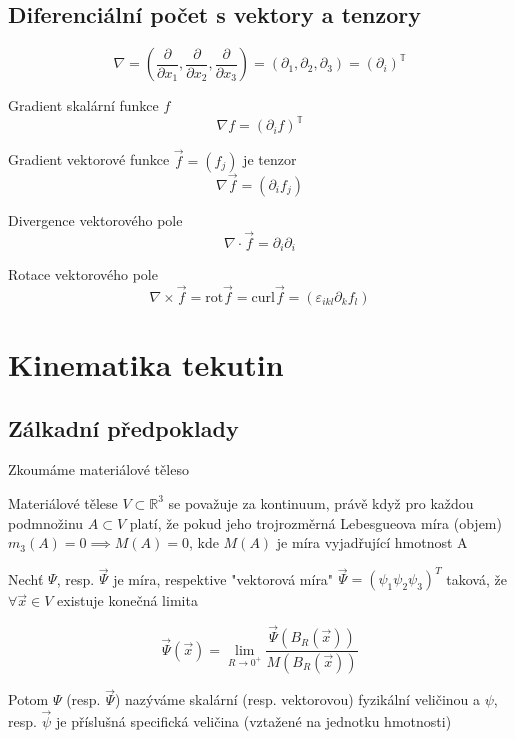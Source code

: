 \documentclass[../main.tex]{subfiles}
\begin{document}
\subsection{Diferenciální počet s vektory a tenzory}

\begin{equation*}
    \nabla = (\frac{\partial}{\partial x_1}, \frac{\partial}{\partial x_2}, \frac{\partial}{\partial x_3}) = (\partial_1, \partial_2, \partial_3) =  (\partial_i)^\mathbb{T}
\end{equation*}


Gradient skalární funkce $f$
\begin{equation*}
    \nabla f = (\partial_i f)^\mathbb{T}
\end{equation*}

Gradient vektorové funkce $\vec{f} = (f_j)$ je tenzor
\begin{equation*}
    \nabla \vec{f} = (\partial_i f_j)
\end{equation*}

Divergence vektorového pole
\begin{equation*}
    \nabla \cdot \vec{f} = \partial_i \partial_i 
\end{equation*}


Rotace vektorového pole 
\begin{equation*}
    \nabla\times\vec{f} = \text{rot} \vec{f} = \text{curl} \vec{f} = (\varepsilon_{ikl} \partial_k f_l)
\end{equation*}

\section{Kinematika tekutin}
\subsection{Zálkadní předpoklady}
Zkoumáme materiálové těleso 
\begin{definition}
    Materiálové tělese $V\subset \mathbb{R}^3$ se považuje za kontinuum, právě když pro každou podmnožinu $A\subset V$ platí,
    že pokud jeho trojrozměrná Lebesgueova míra (objem) $m_3(A) = 0 \implies M(A) = 0$, kde $M(A)$ je míra vyjadřující hmotnost A 
\end{definition}

\begin{definition}
    Nechť $\Psi$, resp. $\vec{\Psi}$ je míra, respektive "vektorová míra" $\vec{\Psi} = (\psi_1 \psi_2 \psi_3)^T$
    taková, že $\forall \vec{x} \in V$ existuje konečná limita 

    \begin{equation*}
        \vec{\Psi} (\vec{x}) = \lim_{R\rightarrow0^+} \frac{\vec{\Psi}(B_R (\vec{x}))}{M (B_R (\vec{x}))}
    \end{equation*}

    Potom $\Psi$ (resp. $\vec{\Psi}$) nazýváme skalární (resp. vektorovou) fyzikální veličinou a $\psi$, resp. $\vec{\psi}$ je příslušná specifická veličina (vztažené na jednotku hmotnosti)
\end{definition}
\end{document}
